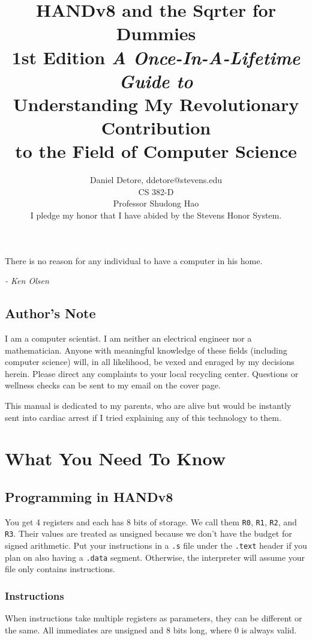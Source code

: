 \documentclass[12pt, oneside]{memoir}
\title{
    {\HUGE\bfseries HANDv8 and the Sqrter for Dummies}\\
    {\large\bfseries 1st Edition}\linebreak\linebreak
    {\large\textit{A Once-In-A-Lifetime Guide to}}\\
    {\Large Understanding My Revolutionary Contribution\\to the Field of Computer Science}\linebreak\linebreak\linebreak\linebreak\linebreak\linebreak\linebreak\linebreak\linebreak\linebreak\linebreak\linebreak\linebreak
}
\author{
    {\Large Daniel Detore}, ddetore@stevens.edu\\
    CS 382-D\\
    Professor Shudong Hao\\
    {I pledge my honor that I have abided by the Stevens Honor System.}
}
\newcommand{\R}[1]{{\color{register}\texttt{R#1}}}
\newcommand{\header}[1]{{\color{header}\texttt{#1}}}
\begin{document}
\frontmatter


\maketitle
\thispagestyle{empty}
\newpage

\raggedright

\epigraph{There is no reason for any individual to have a computer in his home.}{\textit{- Ken Olsen}}
\tableofcontents*
\newpage

\setlength{\parindent}{1.5em}
\setlength{\parskip}{1em}

\chapter{Author's Note}
I am a computer scientist. I am neither an electrical engineer nor a mathematician. Anyone with meaningful knowledge of these fields (including computer science) will, in all likelihood, be vexed and enraged by my decisions herein. Please direct any complaints to your local recycling center. Questions or wellness checks can be sent to my email on the cover page.

This manual is dedicated to my parents, who are alive but would be instantly sent into cardiac arrest if I tried explaining any of this technology to them.

\mainmatter
\part{What You Need To Know}

\chapter{Programming in HANDv8}
You get 4 registers and each has 8 bits of storage. We call them \R{0}, \R{1}, \R{2}, and \R{3}. Their values are treated as unsigned because we don't have the budget for signed arithmetic. Put your instructions in a \texttt{.s} file under the \header{.text} header if you plan on also having a \header{.data} segment. Otherwise, the interpreter will assume your file only contains instructions.

\section{Instructions}
When instructions take multiple registers as parameters, they can be different or the same. All immediates are unsigned and 8 bits long, where 0 is always valid.
\end{document}
